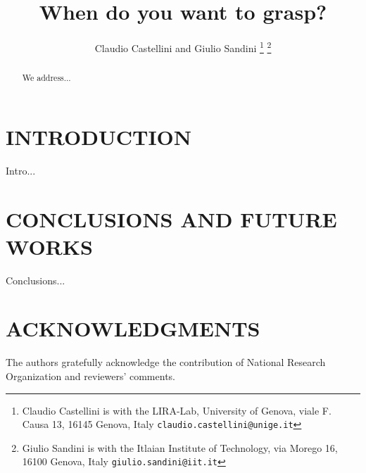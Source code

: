 \documentclass[a4paper, 10pt, conference]{ieeeconf}
\title{\LARGE \bf
When do you want to grasp?
}
\author{Claudio Castellini and Giulio Sandini%
\thanks{Claudio Castellini is with the LIRA-Lab, University of Genova,
viale F. Causa 13, 16145 Genova, Italy
{\tt\small claudio.castellini@unige.it}}%
\thanks{Giulio Sandini is with the Itlaian Institute of Technology,
via Morego 16, 16100 Genova, Italy
{\tt\small giulio.sandini@iit.it}}%
}
\begin{document}
\maketitle
\thispagestyle{empty}
\pagestyle{empty}

\begin{abstract}

We address...

\end{abstract}


\section{INTRODUCTION}

Intro...

\section{CONCLUSIONS AND FUTURE WORKS}

Conclusions... \cite{kawato-99}

\section{ACKNOWLEDGMENTS}

The authors gratefully acknowledge the contribution of National
Research Organization and reviewers' comments.


{\small


}
\end{document}
